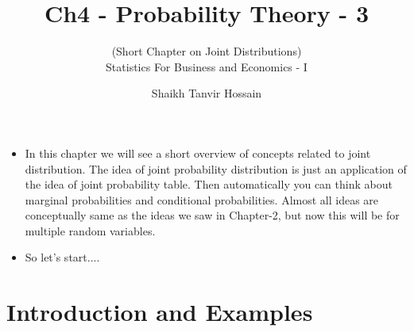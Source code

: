 \documentclass[8pt, usepdftitle=false]{beamer}
\title{\LARGE Ch4 - Probability Theory - 3 }
\subtitle{{\fontsize{10}{10}\selectfont\color{gray!50!balck}
(Short Chapter on Joint Distributions)} 
\\\vspace*{.2cm}Statistics For Business and Economics - I}
\author{Shaikh Tanvir Hossain\vspace*{-.4cm}}
\institute{ East West University, Dhaka\\ Last Updated \today}
\date{\vspace{-5pt}}
\begin{document}



\begin{frame}[allowframebreaks]{}

\begin{itemize}
\item In this chapter we will see a short overview of concepts related to joint distribution. The idea of joint probability distribution is just an application of the idea of joint probability table. Then automatically you can think about marginal probabilities and conditional probabilities. Almost all ideas are conceptually same as the ideas we saw in Chapter-2, but now this will be for multiple random variables.





\item So let's start...\faWalking \faWalking \faWalking.

\end{itemize}

\end{frame}



\section{Introduction and Examples}
\frame{\sectionpage}
\end{document}
